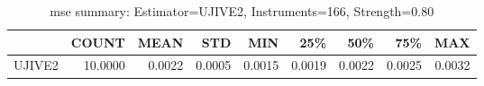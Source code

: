\begin{table}[ht]
\centering
\caption{mse summary: Estimator=UJIVE2, Instruments=166, Strength=0.80}
\begin{tabular}{lrrrrrrrr}
\toprule
 & COUNT & MEAN & STD & MIN & 25\% & 50\% & 75\% & MAX \\
\midrule
UJIVE2 & 10.0000 & 0.0022 & 0.0005 & 0.0015 & 0.0019 & 0.0022 & 0.0025 & 0.0032 \\
\bottomrule
\end{tabular}
\end{table}
